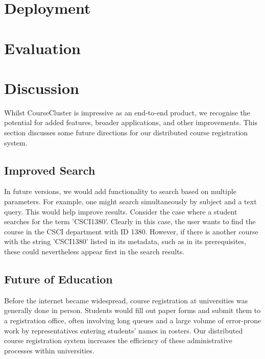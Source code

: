 \documentclass[sigplan, screen, 10pt]{acmart}
\begin{document}
\section{Deployment}

\section{Evaluation}
\label{eval}

\section{Discussion}
Whilst CourseCluster is impressive as an end-to-end product, we recognise the potential for added features, broader applications, and other improvements. This section discusses some future directions for our distributed course registration system.

\subsection{Improved Search}
In future versions, we would add functionality to search based on multiple parameters. For example, one might search simultaneously by subject and a text query. This would help improve results. Consider the case where a student searches for the term 'CSCI1380'. Clearly in this case, the user wants to find the course in the CSCI department with ID 1380. However, if there is another course with the string 'CSCI1380' listed in its metadata, such as in its prerequisites, these could nevertheless appear first in the search results.

\subsection{Future of Education}
Before the internet became widespread, course registration at universities was generally done in person. Students would fill out paper forms and submit them to a registration office, often involving long queues and a large volume of error-prone work by representatives entering students' names in rosters. Our distributed course registration system increases the efficiency of these administrative processes within universities.
\end{document}
